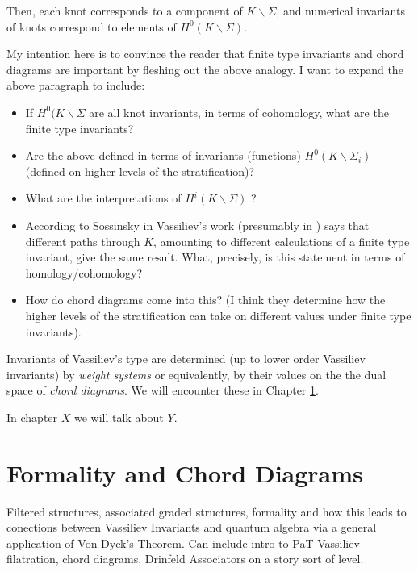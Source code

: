 \documentclass[12pt]{report}
\theoremstyle{regular}
\newcommand{\scaffold}[1]{
\begin{mdframed}[style=scaffold]
        {\color{teal}#1}
\end{mdframed}
}
\begin{document}
        Then, each knot corresponds to a component of \(K \smallsetminus \Sigma\), and numerical invariants of knots correspond to elements of \(H^{0}(K \smallsetminus \Sigma)\).
        \scaffold{
                My intention here is to convince the reader that finite type invariants and chord diagrams are important by fleshing out the above analogy. I want to expand the above paragraph to include:
                \begin{itemize}
                        \item If \(H^{0}(K \smallsetminus \Sigma\) are all knot invariants, in terms of cohomology, what are the finite type invariants?
                        \item Are the above defined in terms of invariants (functions) \(H^{0}(K \smallsetminus \Sigma_{i})\) (defined on higher levels of the stratification)?
                        \item What are the interpretations of \(H^{i}(K \smallsetminus \Sigma)\) \cite[p.149]{complements-of-discriminants-of-smooth-maps-topology-and-applications}?
                        \item According to Sossinsky in \cite[p. 49]{knots-mathematics-with-a-twist} Vassiliev's work (presumably in \cite{complements-of-discriminants-of-smooth-maps-topology-and-applications, cohomology-of-knot-spaces}) says that different paths through \(K\), amounting to different calculations of a finite type invariant, give the same result. What, precisely, is this statement in terms of homology/cohomology?
                        \item How do chord diagrams come into this? (I think they determine how the higher levels of the stratification can take on different values under finite type invariants).
                \end{itemize}
        }

        Invariants of Vassiliev's type are determined (up to lower order Vassiliev invariants) by \textit{weight systems} or equivalently, by their values on the the dual space of \textit{chord diagrams}. We will encounter these in Chapter \ref{ch:formality-chord-diagrams}.

        \scaffold{In chapter \(X\) we will talk about \(Y\).}

        \chapter{Formality and Chord Diagrams}
        \label{ch:formality-chord-diagrams}
        \scaffold{Filtered structures, associated graded structures, formality and how this leads to conections between Vassiliev Invariants and quantum algebra via a general application of Von Dyck's Theorem. Can include intro to PaT Vassiliev filatration, chord diagrams, Drinfeld Associators on a story sort of level.}
\end{document}
